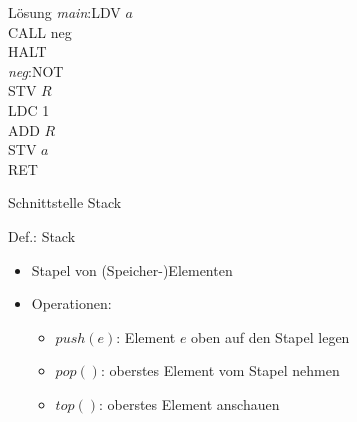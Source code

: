 \begin{frame}
	\begin{block}{Lösung}
		\emph{main}:LDV $a$\\
		CALL neg\\	
		HALT\\
		\emph{neg}:NOT\\
		STV $R$\\
		LDC 1\\
		ADD $R$\\
		STV $a$\\
		RET
	\end{block}
\end{frame}

\begin{frame}{Schnittstelle Stack}
	\begin{block}{Def.: Stack}
		\begin{itemize}
		\item Stapel von (Speicher-)Elementen
		\item Operationen: \begin{itemize}
			\item $push(e)$: Element $e$ oben auf den Stapel legen
			\item $pop()$: oberstes Element vom Stapel nehmen
			\item $top()$: oberstes Element anschauen
		\end{itemize}
	\end{itemize}
	\end{block}
\end{frame}

